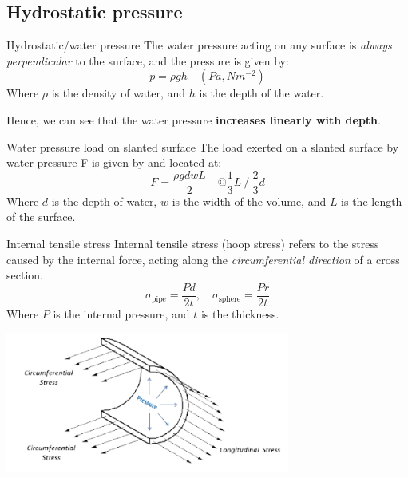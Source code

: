 \subsection{Hydrostatic pressure}
\begin{definition}
    {Hydrostatic/water pressure}
    The water pressure acting on any surface is \emph{always perpendicular} to the surface, and the pressure is given by:
    \[p=\rho gh\quad(Pa, Nm^{-2})\]
    Where $\rho$ is the density of water,  and $h$ is the depth of the water.

    Hence, we can see that the water pressure \textbf{increases linearly with depth}.
\end{definition}
\begin{theorem}
    {Water pressure load on slanted surface}
    The load exerted on a slanted surface by water pressure F is given by and located at:
    \[F=\frac{\rho g d w L}{2}\quad @ \frac{1}{3}L\ /\ \frac{2}{3}d\]
    Where $d$ is the depth of water, $w$ is the width of the volume, and $L$ is the length of the surface.
\end{theorem}
\begin{definition}
    {Internal tensile stress}
    Internal tensile stress (hoop stress) refers to the stress caused by the internal force, acting along the \emph{circumferential direction} of a cross section. 
    \[\sigma_{\text{pipe}}=\frac{Pd}{2t},\quad\sigma_{\text{sphere}}=\frac{Pr}{2t}\]
    Where $P$ is the internal pressure, and $t$ is the thickness. 
    \begin{center}
        \includegraphics[width=0.7\textwidth]{./img/hoop.png}
    \end{center}
\end{definition}